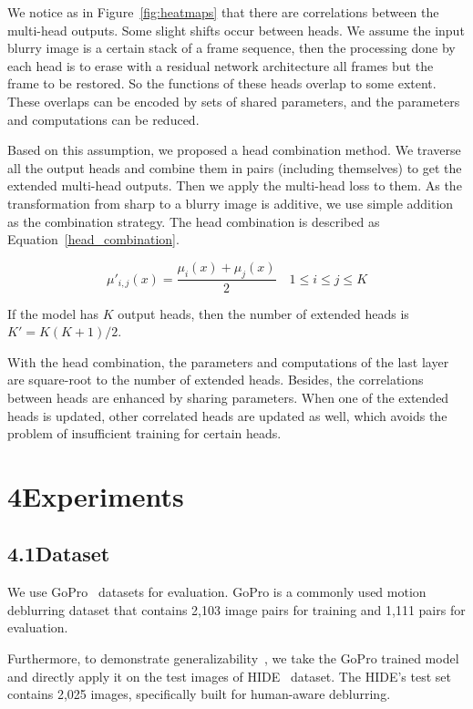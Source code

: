 \documentclass[letterpaper]{article} \usepackage{aaai23}  \usepackage{times}  \usepackage{helvet}  \usepackage{courier}  \usepackage[hyphens]{url}  \usepackage{graphicx} \urlstyle{rm} \def\UrlFont{\rm}  \usepackage{natbib}  \usepackage{caption} \frenchspacing  \setlength{\pdfpagewidth}{8.5in} \setlength{\pdfpageheight}{11in} \usepackage{algorithm}
\begin{document}
We notice as in Figure~\ref{fig:heatmaps} that there are correlations between the multi-head outputs. Some slight shifts occur between heads. We assume the input blurry image is a certain stack of a frame sequence, then the processing done by each head is to erase with a residual network architecture all frames but the frame to be restored. So the functions of these heads overlap to some extent. These overlaps can be encoded by sets of shared parameters, and the parameters and computations can be reduced.

Based on this assumption, we proposed a head combination method. We traverse all the output heads and combine them in pairs (including themselves) to get the extended multi-head outputs. Then we apply the multi-head loss to them. As the transformation from sharp to a blurry image is additive, we use simple addition as the combination strategy. The head combination is described as Equation~\ref{head_combination}.

\begin{equation}
    \label{head_combination}
    \mu'_{i,j}(x)=\frac{\mu_i(x)+\mu_j(x)}{2}\quad 1\leq i\leq j \leq K
\end{equation}

If the model has $K$ output heads, then the number of extended heads is $K'=K(K+1)/2$. 

With the head combination, the parameters and computations of the last layer are square-root to the number of extended heads. Besides, the correlations between heads are enhanced by sharing parameters. When one of the extended heads is updated, other correlated heads are updated as well, which avoids the problem of insufficient training for certain heads.

\section{4\quad Experiments}

\subsection{4.1\quad Dataset}

We use GoPro~\cite{Nah_2017_CVPR} datasets for evaluation. GoPro is a commonly used motion deblurring dataset that contains 2,103 image pairs for training and 1,111 pairs for evaluation. 

Furthermore, to demonstrate generalizability~\cite{zamir2021multi, wang2022uformer, chen2022simple}, we take the GoPro trained model and directly apply it on the test images of HIDE~\cite{shen2019human} dataset. The HIDE's test set contains 2,025 images, specifically built for human-aware deblurring. 
\end{document}
